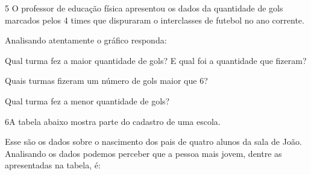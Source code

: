 
\num{5} O professor de educação física apresentou os dados da quantidade de
gols marcados pelos 4 times que dispuraram o interclasses de futebol no
ano corrente.


Analisando atentamente o gráfico responda:

\begin{escolha}
\item
  Qual turma fez a maior quantidade de gols? E qual foi a quantidade que
  fizeram?


\item
  Quais turmas fizeram um número de gols maior que 6?


\item
  Qual turma fez a menor quantidade de gols?

\end{escolha}


\num{6}A tabela abaixo mostra parte do cadastro de uma escola.


Esse são os dados sobre o nascimento dos pais de quatro alunos da sala
de João. Analisando os dados podemos perceber que a pessoa mais jovem,
dentre as apresentadas na tabela, é:

